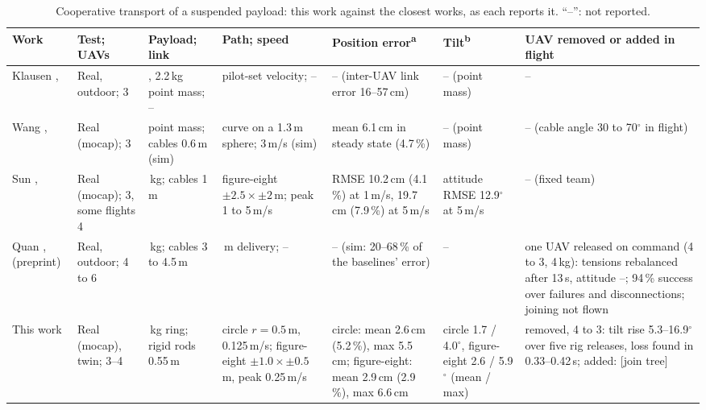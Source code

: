 \begin{table}[htbp]
\centering
\footnotesize
\setlength{\tabcolsep}{3pt}
\caption{Cooperative transport of a suspended payload: this work against the closest works, as each
reports it. ``--'': not reported.}
\label{tab:lit_compare}
\begin{tabularx}{\textwidth}{@{}
  >{\raggedright\arraybackslash\hsize=0.95\hsize}X
  >{\raggedright\arraybackslash\hsize=0.80\hsize}X
  >{\raggedright\arraybackslash\hsize=0.85\hsize}X
  >{\raggedright\arraybackslash\hsize=1.05\hsize}X
  >{\raggedright\arraybackslash\hsize=1.25\hsize}X
  >{\raggedright\arraybackslash\hsize=0.85\hsize}X
  >{\raggedright\arraybackslash\hsize=1.25\hsize}X@{}}
\toprule
Work & Test; UAVs & Payload; link & Path; speed & Position error\textsuperscript{a} &
Tilt\textsuperscript{b} & UAV removed or added in flight \\
\midrule
Klausen \cite{klausen2020cooperative},\newline 2020 & Real, outdoor; 3 & 1.0, 2.2\,kg point mass; -- &
pilot-set velocity; -- & -- (inter-UAV link error 16--57\,cm) & -- (point mass) & -- \\
\addlinespace
Wang \cite{wangRobustCooperativeTransportation2024},\newline 2024 & Real (mocap); 3 & point mass; cables
0.6\,m (sim) & curve on a 1.3\,m sphere; 3\,m/s (sim) & mean 6.1\,cm in steady state (4.7\,\%) &
-- (point mass) & -- (cable angle 30 to 70$^\circ$ in flight) \\
\addlinespace
Sun \cite{tudelft},\newline 2025 & Real (mocap); 3, some flights 4 & 1.4\,kg; cables 1\,m & figure-eight
$\pm2.5 \times \pm2$\,m; peak 1 to 5\,m/s & RMSE 10.2\,cm (4.1\,\%) at 1\,m/s, 19.7\,cm (7.9\,\%) at
5\,m/s & attitude RMSE 12.9$^\circ$ at 5\,m/s & -- (fixed team) \\
\addlinespace
Quan \cite{quan2025swarm},\newline 2025 (preprint) & Real, outdoor; 4 to 6 & 5\,kg; cables 3 to 4.5\,m &
34\,m delivery; -- & -- (sim: 20--68\,\% of the baselines' error) & -- & one UAV released on command (4 to 3, 4\,kg):
tensions rebalanced after 13\,s, attitude --; 94\,\% success over failures and disconnections; joining not flown \\
\midrule
This work & Real (mocap), twin; 3--4 & 0.86\,kg ring; rigid rods 0.55\,m & circle $r = 0.5$\,m,
0.125\,m/s; figure-eight $\pm1.0 \times \pm0.5$\,m, peak 0.25\,m/s & circle: mean 2.6\,cm (5.2\,\%), max 5.5\,cm;
figure-eight: mean 2.9\,cm (2.9\,\%), max 6.6\,cm & circle 1.7 / 4.0$^\circ$, figure-eight 2.6 / 5.9$^\circ$ (mean /
max) & removed, 4 to 3: tilt rise 5.3--16.9$^\circ$ over five rig releases, loss found in 0.33--0.42\,s; added: [join
tree] \\
\bottomrule
\end{tabularx}


\end{table}
